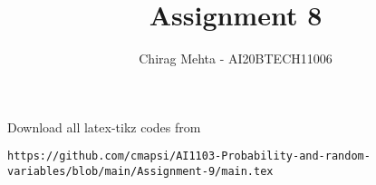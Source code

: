 \documentclass[journal,12pt,twocolumn]{IEEEtran}
\DeclareMathOperator*{\Res}{Res}
\begin{document}
\newcommand{\BEQA}{\begin{eqnarray}}
\newcommand{\EEQA}{\end{eqnarray}}
\newcommand{\define}{\stackrel{\triangle}{=}}

\raggedbottom
\setlength{\parindent}{0pt}
\providecommand{\mbf}{\mathbf}
\providecommand{\pr}[1]{\ensuremath{\Pr\left(#1\right)}}
\providecommand{\qfunc}[1]{\ensuremath{Q\left(#1\right)}}
\providecommand{\sbrak}[1]{\ensuremath{{}\left[#1\right]}}
\providecommand{\lsbrak}[1]{\ensuremath{{}\left[#1\right.}}
\providecommand{\rsbrak}[1]{\ensuremath{{}\left.#1\right]}}
\providecommand{\brak}[1]{\ensuremath{\left(#1\right)}}
\providecommand{\lbrak}[1]{\ensuremath{\left(#1\right.}}
\providecommand{\rbrak}[1]{\ensuremath{\left.#1\right)}}
\providecommand{\cbrak}[1]{\ensuremath{\left\{#1\right\}}}
\providecommand{\lcbrak}[1]{\ensuremath{\left\{#1\right.}}
\providecommand{\rcbrak}[1]{\ensuremath{\left.#1\right\}}}
\DeclarePairedDelimiter\ceil{\lceil}{\rceil}
\DeclarePairedDelimiter\floor{\lfloor}{\rfloor}
\theoremstyle{remark}
\newtheorem{rem}{Remark}
\newcommand{\sgn}{\mathop{\mathrm{sgn}}}
\providecommand{\abs}[1]{\vert#1\vert}
\providecommand{\res}[1]{\Res\displaylimits_{#1}} 
\providecommand{\norm}[1]{\lVert#1\rVert}
\providecommand{\mtx}[1]{\mathbf{#1}}
\providecommand{\mean}[1]{E[ #1 ]}
\providecommand{\fourier}{\overset{\mathcal{F}}{ \rightleftharpoons}}
\providecommand{\system}{\overset{\mathcal{H}}{ \longleftrightarrow}}
\newcommand{\solution}{\noindent \textbf{Solution: }}
\newcommand{\cosec}{\,\text{cosec}\,}
\newcommand*{\permcomb}[4][0mu]{{{}^{#3}\mkern#1#2_{#4}}}
\newcommand*{\perm}[1][-3mu]{\permcomb[#1]{P}}
\newcommand*{\comb}[1][-1mu]{\permcomb[#1]{C}}
\providecommand{\dec}[2]{\ensuremath{\overset{#1}{\underset{#2}{\gtrless}}}}
\newcommand{\myvec}[1]{\ensuremath{\begin{pmatrix}#1\end{pmatrix}}}
\newcommand{\mydet}[1]{\ensuremath{\begin{vmatrix}#1\end{vmatrix}}}
\makeatletter
{}
\makeatother
\let\StandardTheFigure\thefigure
\let\vec\mathbf
\renewcommand{\thefigure}{\theproblem}
\def\putbox#1#2#3{\makebox[0in][l]{\makebox[#1][l]{}\raisebox{\baselineskip}[0in][0in]{\raisebox{#2}[0in][0in]{#3}}}}
     \def\rightbox#1{\makebox[0in][r]{#1}}
     \def\centbox#1{\makebox[0in]{#1}}
     \def\topbox#1{\raisebox{-\baselineskip}[0in][0in]{#1}}
     \def\midbox#1{\raisebox{-0.5\baselineskip}[0in][0in]{#1}}
\vspace{3cm}
\title{Assignment 8}
\author{Chirag Mehta - AI20BTECH11006}
\maketitle
\newpage
\bigskip
\renewcommand{\thefigure}{\theenumi}
\renewcommand{\thetable}{\theenumi}
Download all latex-tikz codes from 
\begin{lstlisting}
https://github.com/cmapsi/AI1103-Probability-and-random-variables/blob/main/Assignment-9/main.tex
\end{lstlisting}
\end{document}
